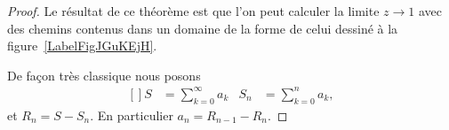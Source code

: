 \begin{proof}

	Le résultat de ce théorème est que l'on peut calculer la limite \( z\to 1\) avec des chemins contenus dans un domaine de la forme de celui dessiné à la figure~\ref{LabelFigJGuKEjH}. %
	\newcommand{\CaptionFigJGuKEjH}{La zone dans laquelle peut être le chemin qui va vers \( z=1\).}
	

	De façon très classique nous posons
	\begin{equation}
		\begin{aligned}[]
			S & =\sum_{k=0}^{\infty}a_k & S_n & =\sum_{k=0}^na_k,
		\end{aligned}
	\end{equation}
	et \( R_n=S-S_n\). En particulier \( a_n=R_{n-1}-R_n\).


\end{proof}
